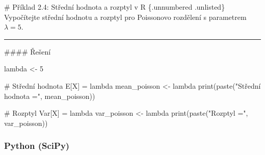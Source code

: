\documentclass[
  czech,
  11pt,
  letterpaper,
  DIV=11,
  numbers=noendperiod]{scrreprt}
\newenvironment{Shaded}{\begin{snugshade}}{\end{snugshade}}
\newcommand{\CommentTok}[1]{\textcolor[rgb]{0.37,0.37,0.37}{#1}}
\newcommand{\DecValTok}[1]{\textcolor[rgb]{0.68,0.00,0.00}{#1}}
\newcommand{\FunctionTok}[1]{\textcolor[rgb]{0.28,0.35,0.67}{#1}}
\newcommand{\NormalTok}[1]{\textcolor[rgb]{0.00,0.23,0.31}{#1}}
\newcommand{\OtherTok}[1]{\textcolor[rgb]{0.00,0.23,0.31}{#1}}
\newcommand{\StringTok}[1]{\textcolor[rgb]{0.13,0.47,0.30}{#1}}
\begin{document}
\begin{tcolorbox}[enhanced jigsaw, arc=.35mm, bottomrule=.15mm, bottomtitle=1mm, breakable, colback=white, colbacktitle=quarto-callout-note-color!10!white, colframe=quarto-callout-note-color-frame, coltitle=black, left=2mm, leftrule=.75mm, opacityback=0, opacitybacktitle=0.6, rightrule=.15mm, title=\textcolor{quarto-callout-note-color}{\faInfo}\hspace{0.5em}{Poznámka}, titlerule=0mm, toprule=.15mm, toptitle=1mm]

\# Příklad 2.4: Střední hodnota a rozptyl v R \{.unnumbered .unlisted\}
Vypočítejte střední hodnotu a rozptyl pro Poissonovo rozdělení s
parametrem \(\lambda=5\).

\begin{center}\rule{0.5\linewidth}{0.5pt}\end{center}

\#\#\#\# Řešení

\begin{Shaded}
\begin{Highlighting}[]
\NormalTok{lambda }\OtherTok{\textless{}{-}} \DecValTok{5}

\CommentTok{\# Střední hodnota E[X] = lambda}
\NormalTok{mean\_poisson }\OtherTok{\textless{}{-}}\NormalTok{ lambda}
\FunctionTok{print}\NormalTok{(}\FunctionTok{paste}\NormalTok{(}\StringTok{"Střední hodnota ="}\NormalTok{, mean\_poisson))}

\CommentTok{\# Rozptyl Var[X] = lambda}
\NormalTok{var\_poisson }\OtherTok{\textless{}{-}}\NormalTok{ lambda}
\FunctionTok{print}\NormalTok{(}\FunctionTok{paste}\NormalTok{(}\StringTok{"Rozptyl ="}\NormalTok{, var\_poisson))}
\end{Highlighting}
\end{Shaded}

\end{tcolorbox}

\subsubsection*{Python (SciPy)}\label{python-scipy-1}
\end{document}
